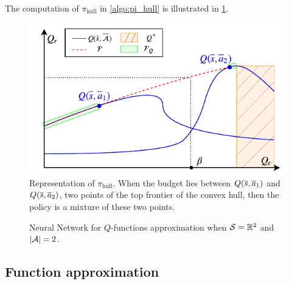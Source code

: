 \documentclass{article}
\begin{document}
The computation of $\pi_\text{hull}$ in \cref{algo:pi_hull} is illustrated in \cref{fig:hull}.

\begin{minipage}[t]{0.5\textwidth}
\vspace{0pt}
\begin{figure}[H]
    \centering
    \includegraphics[width=\linewidth]{source/img/pi.pdf}
    \caption{Representation of $\pi_\text{hull}$. When the budget lies between $Q(\overline{s},\overline{a}_1)$ and $Q(\overline{s},\overline{a}_2)$, two points of the top frontier of the convex hull, then the policy is a mixture of these two points.}
    \label{fig:hull}
\end{figure}
\end{minipage}
\begin{minipage}[t]{0.5\textwidth}
\begin{figure}[H]
    \centering
    
    \caption{Neural Network for $Q$-functions approximation when $\mathcal{S}=\mathbb{R}^2$ and $|\mathcal{A}| = 2$.}
    \label{fig:architecture}
\end{figure}
\end{minipage}

\subsection{Function approximation}
\end{document}
